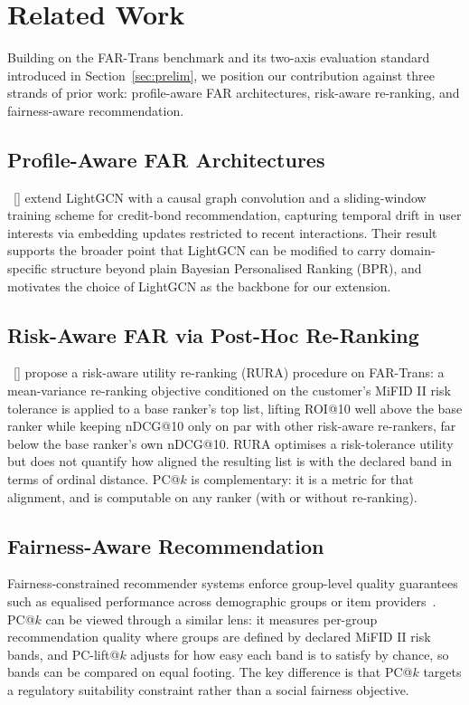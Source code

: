 \section{Related Work}
\label{sec:relatedwork}

Building on the FAR-Trans benchmark and its two-axis evaluation standard introduced in Section~\ref{sec:prelim}, we position our contribution against three strands of prior work: profile-aware FAR architectures, risk-aware re-ranking, and fairness-aware recommendation.

\subsection{Profile-Aware FAR Architectures}
\citeauthor{Ghiye_2024}~[\citeyear{Ghiye_2024}] extend LightGCN with a causal graph convolution and a sliding-window training scheme for credit-bond recommendation, capturing temporal drift in user interests via embedding updates restricted to recent interactions. Their result supports the broader point that LightGCN can be modified to carry domain-specific structure beyond plain Bayesian Personalised Ranking (BPR), and motivates the choice of LightGCN as the backbone for our extension.

\subsection{Risk-Aware FAR via Post-Hoc Re-Ranking}
\citeauthor{10.1145/3773966.3779383}~[\citeyear{10.1145/3773966.3779383}] propose a risk-aware utility re-ranking (RURA) procedure on FAR-Trans: a mean-variance re-ranking objective conditioned on the customer's MiFID II risk tolerance is applied to a base ranker's top list, lifting ROI@10 well above the base ranker while keeping nDCG@10 only on par with other risk-aware re-rankers, far below the base ranker's own nDCG@10. RURA optimises a risk-tolerance utility but does not quantify how aligned the resulting list is with the declared band in terms of ordinal distance. PC@$k$ is complementary: it is a metric for that alignment, and is computable on any ranker (with or without re-ranking).

\subsection{Fairness-Aware Recommendation}
Fairness-constrained recommender systems enforce group-level quality guarantees such as equalised performance across demographic groups or item providers~\cite{zhao2024fairnessdiversityrecommendersystems}. PC@$k$ can be viewed through a similar lens: it measures per-group recommendation quality where groups are defined by declared MiFID II risk bands, and PC-lift@$k$ adjusts for how easy each band is to satisfy by chance, so bands can be compared on equal footing. The key difference is that PC@$k$ targets a regulatory suitability constraint rather than a social fairness objective.

